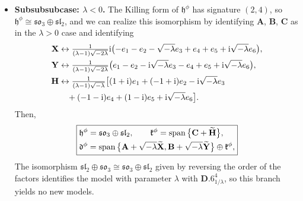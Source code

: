 \documentclass[pdftex]{sigma}
\newlength{\caseIndent}
\newcommand{\wt} [1]{\smash{\widetilde{#1}}}
\newcommand{\mbA}{\mathbf{A}}
\newcommand{\mbB}{\mathbf{B}}
\newcommand{\mbC}{\mathbf{C}}
\newcommand{\mbH}{\mathbf{H}}
\newcommand{\mbX}{\mathbf{X}}
\newcommand{\mbY}{\mathbf{Y}}
\newcommand{\mfd} {\mathfrak{d}}
\newcommand{\mfh} {\mathfrak{h}}
\newcommand{\mfk} {\mathfrak{k}}
\newcommand{\mfsl} {\mathfrak{sl}}
\newcommand{\mfso} {\mathfrak{so}}
\numberwithin{equation}{section}
\begin{document}
\begin{itemize}[leftmargin=\caseIndent]
\begin{itemize}[leftmargin=\caseIndent]
\begin{itemize}[leftmargin=\caseIndent]
		\item[] \textbf{Subsubsubcase: $\lambda < 0$.} The Killing form of $\mfh^{\phi}$ has signature $(2, 4)$, so $\mfh^{\phi} \cong \mfso_3 \oplus \mfsl_2$, and we can realize this isomorphism by identifying $\mbA$, $\mbB$, $\mbC$ as in the $\lambda > 0$ case and identifying
		\begin{align*}
			\mbX
				&\leftrightarrow \tfrac{1}{(\lambda - 1) \sqrt{- 2 \lambda}} {\rm i} \big({-}e_1 - e_2 - \sqrt{-\lambda} e_3 + e_4 + e_5 + {\rm i} \sqrt{-\lambda} e_6\big) , \\
			\mbY
				&\leftrightarrow \tfrac{1}{(\lambda - 1) \sqrt{- 2 \lambda}} \big(e_1 - e_2 - {\rm i} \sqrt{-\lambda} e_3 - e_4 + e_5 + {\rm i} \sqrt{-\lambda} e_6\big) , \\
			\mbH
				&\leftrightarrow \tfrac{1}{(\lambda - 1) \sqrt{-\lambda}} \big[(1 + {\rm i}) e_1 + (-1 + {\rm i}) e_2 - {\rm i} \sqrt{-\lambda} e_3 \\
 &\quad {}+ (-1 - {\rm i}) e_4 + (1 - {\rm i}) e_5 + {\rm i} \sqrt{-\lambda} e_6\big] .
		\end{align*}
		Then,
		\begin{equation*}
			\boxed{
 \begin{split}
 &\mfh^{\phi} = \mfso_3 \oplus \mfsl_2 , \qquad
	 	 \mfk^{\phi} = \operatorname{span}\big\{\mbC + \wt\mbH\big\} , \\
 &\mfd^{\phi} = \operatorname{span}\big\{
								\mbA + \sqrt{-\lambda} \wt\mbX,
								\mbB + \sqrt{-\lambda} \wt\mbY
							 \big\} \oplus \mfk^{\phi} ,
 \end{split}
			}
		\end{equation*}
		The isomorphism $\mfsl_2 \oplus \mfso_3 \cong \mfso_3 \oplus \mfsl_2$ given by reversing the order of the factors identifies the model with parameter $\lambda$ with $\mathbf{D.6}_{1 / \lambda}^4$, so this branch yields no new models.
		\end{itemize}
	\end{itemize}
\end{itemize}
\end{document}
